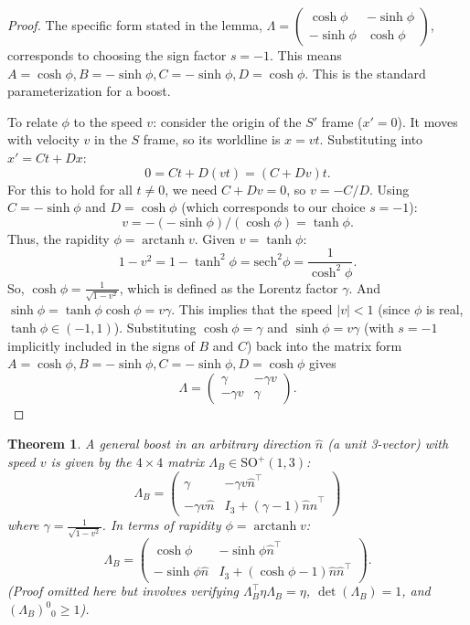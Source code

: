 \documentclass{amsart}
\newtheorem{theorem}{Theorem}[section]
\theoremstyle{definition}
\theoremstyle{remark}
\DeclareMathOperator{\arctanh}{arctanh}
\begin{document}
\begin{proof}
  The specific form stated in the lemma, $\Lambda = \begin{pmatrix} \cosh\phi & -\sinh\phi \\ -\sinh\phi & \cosh\phi \end{pmatrix}$, corresponds to choosing the sign factor $s=-1$.
  This means $A = \cosh\phi, B = -\sinh\phi, C = -\sinh\phi, D = \cosh\phi$. This is the standard parameterization for a boost.

  To relate $\phi$ to the speed $v$: consider the origin of the $S'$ frame ($x'=0$). It moves with velocity $v$ in the $S$ frame, so its worldline is $x=vt$.
  Substituting into $x' = C t + D x$:
  \[ 0 = C t + D (vt) = (C + Dv)t. \]
  For this to hold for all $t \neq 0$, we need $C+Dv=0$, so $v = -C/D$.
  Using $C = -\sinh\phi$ and $D = \cosh\phi$ (which corresponds to our choice $s=-1$):
  \[ v = -(-\sinh\phi) / (\cosh\phi) = \tanh\phi. \]
  Thus, the rapidity $\phi = \arctanh v$.
  Given $v = \tanh\phi$:
  \[ 1 - v^2 = 1 - \tanh^2\phi = \mathrm{sech}^2\phi = \frac{1}{\cosh^2\phi}. \]
  So, $\cosh\phi = \frac{1}{\sqrt{1-v^2}}$, which is defined as the Lorentz factor $\gamma$.
  And $\sinh\phi = \tanh\phi \cosh\phi = v\gamma$.
  This implies that the speed $|v| < 1$ (since $\phi$ is real, $\tanh\phi \in (-1,1)$).
  Substituting $\cosh\phi = \gamma$ and $\sinh\phi = v\gamma$ (with $s=-1$ implicitly included in the signs of $B$ and $C$) back into the matrix form $A=\cosh\phi, B=-\sinh\phi, C=-\sinh\phi, D=\cosh\phi$ gives
  \begin{equation*}
    \Lambda =
    \begin{pmatrix}
      \gamma & -\gamma v \\
      -\gamma v & \gamma
    \end{pmatrix}.
  \end{equation*}
\end{proof}

\begin{theorem}\label{thm:general_boost_so13}
  A general boost in an arbitrary direction $\hat{n}$ (a unit 3-vector) with speed $v$ is given by the $4 \times 4$ matrix $\Lambda_B \in \mathrm{SO}^+(1,3)$:
  \begin{equation*}
    \Lambda_B =
    \begin{pmatrix}
      \gamma & -\gamma v \hat{n}^\top \\
      -\gamma v \hat{n} & I_3 + \left(\gamma-1\right)\hat{n}\hat{n}^\top
    \end{pmatrix}
  \end{equation*}
  where $\gamma=\frac{1}{\sqrt{1-v^2}}$. In terms of rapidity $\phi=\arctanh v$:
  \begin{equation*}
    \Lambda_B =
    \begin{pmatrix}
      \cosh \phi & -\sinh \phi \hat{n}^\top \\
      -\sinh \phi \hat{n} & I_3 + (\cosh \phi - 1) \hat{n} \hat{n}^\top
    \end{pmatrix}.
  \end{equation*}
  (Proof omitted here but involves verifying $\Lambda_B^\top \eta \Lambda_B = \eta$, $\det(\Lambda_B)=1$, and $(\Lambda_B)^0{}_0 \ge 1$).
\end{theorem}
\end{document}

